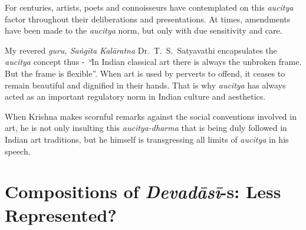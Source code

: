 For centuries, artists, poets and connoisseurs have contemplated on this \textit{aucitya} factor throughout their deliberations and presentations. At times, amendments have been made to the \textit{aucitya} norm, but only with due sensitivity and care.

My revered \textit{guru, Saṅgīta Kalāratna} Dr.~T.~S.~Satyavathi encapsulates the \textit{aucitya} concept thus - \textit{“}In Indian classical art there is always the unbroken frame. But the frame is flexible”. When art is used by perverts to offend, it ceases to remain beautiful and dignified in their hands. That is why \textit{aucitya} has always acted as an important regulatory norm in Indian culture and aesthetics.

When Krishna makes scornful remarks against the social conventions involved in art, he is not only insulting this \textit{aucitya-dharma} that is being duly followed in Indian art traditions, but he himself is transgressing all limits of \textit{aucitya} in his speech.

\vspace{-.3cm}

\section*{\fontsize{13pt}{15pt}\selectfont Compositions of \textit{Devadāsī}-s: Less Represented?\relax}

